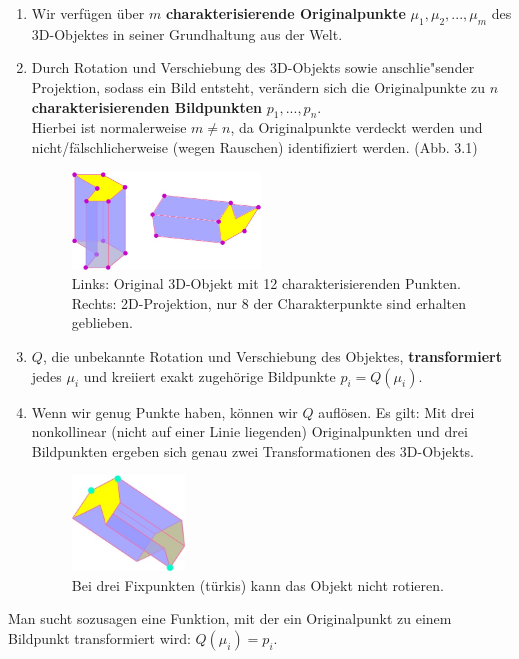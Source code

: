\begin{enumerate}
\item Wir verfügen über $m$ \textbf{charakterisierende Originalpunkte} \mbox{$\mu_1,\mu_2,...,\mu_m$} des 3D-Objektes in seiner Grundhaltung aus der Welt.
\item Durch Rotation und Verschiebung des 3D-Objekts sowie anschlie"sender Projektion, sodass ein Bild entsteht, verändern sich die Originalpunkte zu $n$ \textbf{charakterisierenden Bildpunkten} $p_1,...,p_n$. \\
Hierbei ist normalerweise $m\neq n$, da Originalpunkte verdeckt werden und nicht/fälschlicherweise (wegen Rauschen) identifiziert werden. (Abb. 3.1)
\begin{figure}[h]
\centering
\includegraphics[width=5cm]{chapters/computervision/grafik_14_3d2d.jpg}
\caption{Links: Original 3D-Objekt mit 12 charakterisierenden Punkten. Rechts: 2D-Projektion, nur 8 der Charakterpunkte sind erhalten geblieben.}
\label{fig:14}
\end{figure}

\item $Q$, die unbekannte Rotation und Verschiebung des Objektes, \textbf{transformiert} jedes $\mu_i$ und kreiiert exakt zugehörige Bildpunkte $p_i=Q(\mu_i)$.
\item Wenn wir genug Punkte haben, können wir $Q$ auflösen. Es gilt: Mit drei nonkollinear (nicht auf einer Linie liegenden) Originalpunkten und drei Bildpunkten ergeben sich genau zwei Transformationen des 3D-Objekts.
\begin{figure}[h]
\centering
\includegraphics[width=3cm]{chapters/computervision/grafik_13_fixpunkte.jpg}
\caption{Bei drei Fixpunkten (türkis) kann das Objekt nicht rotieren.}
\label{fig:13}
\end{figure}
\end{enumerate}
Man sucht sozusagen eine Funktion, mit der ein Originalpunkt zu einem Bildpunkt transformiert wird: $Q(\mu_i)=p_i$.

